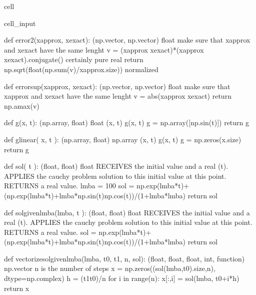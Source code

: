 \documentclass[letterpaper,10pt,english]{jupyterBook}
\begin{document}
\begin{sphinxuseclass}{cell}
\begin{sphinxVerbatimInput}
\begin{sphinxuseclass}{cell_input}
\begin{sphinxVerbatim}[commandchars=\\\{\}]
def error\PYGZus{}2(x\PYGZus{}approx, x\PYGZus{}exact):
    \PYGZsq{}\PYGZsq{}\PYGZsq{} (np.vector, np.vector) \PYGZhy{}\PYGZgt{} float \PYGZsq{}\PYGZsq{}\PYGZsq{}
    \PYGZsh{}make sure that x\PYGZus{}approx and x\PYGZus{}exact have the same lenght
    v = (x\PYGZus{}approx \PYGZhy{} x\PYGZus{}exact)*(x\PYGZus{}approx \PYGZhy{} x\PYGZus{}exact).conjugate()
    \PYGZsh{}\PYGZca{}certainly pure real
    return np.sqrt(float(np.sum(v)/x\PYGZus{}approx.size)) \PYGZsh{}normalized

def error\PYGZus{}sup(x\PYGZus{}approx, x\PYGZus{}exact):
    \PYGZsq{}\PYGZsq{}\PYGZsq{} (np.vector, np.vector) \PYGZhy{}\PYGZgt{} float \PYGZsq{}\PYGZsq{}\PYGZsq{}
    \PYGZsh{}make sure that x\PYGZus{}approx and x\PYGZus{}exact have the same lenght
    v = abs(x\PYGZus{}approx \PYGZhy{} x\PYGZus{}exact)
    return np.amax(v)

def g(x, t):
    \PYGZsq{}\PYGZsq{}\PYGZsq{} (np.array, float) \PYGZhy{}\PYGZgt{} float
        (x, t) \PYGZhy{}\PYGZgt{} g(x, t)
    \PYGZsq{}\PYGZsq{}\PYGZsq{}
    g = np.array([np.sin(t)])
    return g

def g\PYGZus{}linear( x, t ):
    \PYGZsq{}\PYGZsq{}\PYGZsq{} (np.array, float) \PYGZhy{}\PYGZgt{} np.array
        (x, t) \PYGZhy{}\PYGZgt{} g(x, t)
    \PYGZsq{}\PYGZsq{}\PYGZsq{}
    g = np.zeros(x.size)
    return g

def sol( t ):
    \PYGZsq{}\PYGZsq{}\PYGZsq{} (float, float) \PYGZhy{}\PYGZgt{} float
    RECEIVES the initial value and a real (t).
    APPLIES the cauchy problem solution to this initial value at this point.
    RETURNS a real value.
    \PYGZsq{}\PYGZsq{}\PYGZsq{}
    lmba = 100
    sol = np.exp(\PYGZhy{}lmba*t)+(np.exp(\PYGZhy{}lmba*t)+lmba*np.sin(t)\PYGZhy{}np.cos(t))/(1+lmba*lmba)
    return sol

def sol\PYGZus{}given\PYGZus{}lmba(lmba, t ):
    \PYGZsq{}\PYGZsq{}\PYGZsq{} (float, float) \PYGZhy{}\PYGZgt{} float
    RECEIVES the initial value and a real (t).
    APPLIES the cauchy problem solution to this initial value at this point.
    RETURNS a real value.
    \PYGZsq{}\PYGZsq{}\PYGZsq{}
    sol = np.exp(\PYGZhy{}lmba*t)+(np.exp(\PYGZhy{}lmba*t)+lmba*np.sin(t)\PYGZhy{}np.cos(t))/(1+lmba*lmba)
    return sol

def vectorize\PYGZus{}sol\PYGZus{}given\PYGZus{}lmba(lmba, t0, t1, n, sol):
    \PYGZsq{}\PYGZsq{}\PYGZsq{}
    (float, float, float, int, function) \PYGZhy{}\PYGZgt{} np.vector
    n is the number of steps
    \PYGZsq{}\PYGZsq{}\PYGZsq{}
    x = np.zeros((sol(lmba,t0).size,n), dtype=np.complex\PYGZus{})
    h = (t1\PYGZhy{}t0)/n
    for i in range(n):
        x[:,i] = sol(lmba, t0+i*h)
    return x


\end{sphinxVerbatim}
\end{sphinxuseclass}
\end{sphinxVerbatimInput}
\end{sphinxuseclass}
\end{document}
